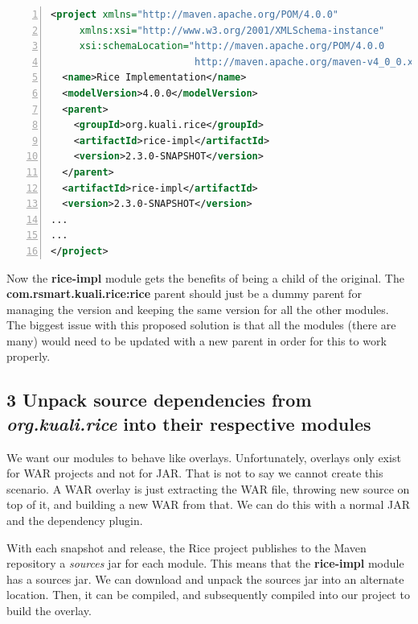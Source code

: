 \documentclass[12pt,notitlepage]{article}
\begin{document}
\begin{lstlisting}[numbers=left,language=xml,basicstyle=\scriptsize,backgroundcolor=\color{ubergray},caption={Custom Impl Module Alternative Parent Definition},frame=single,breaklines=true]
<project xmlns="http://maven.apache.org/POM/4.0.0" 
     xmlns:xsi="http://www.w3.org/2001/XMLSchema-instance" 
     xsi:schemaLocation="http://maven.apache.org/POM/4.0.0 
                         http://maven.apache.org/maven-v4_0_0.xsd">
  <name>Rice Implementation</name>
  <modelVersion>4.0.0</modelVersion>
  <parent>
    <groupId>org.kuali.rice</groupId>
    <artifactId>rice-impl</artifactId>
    <version>2.3.0-SNAPSHOT</version>
  </parent>
  <artifactId>rice-impl</artifactId>
  <version>2.3.0-SNAPSHOT</version>
...
...
</project>
  \end{lstlisting}

Now the \textbf{rice-impl} module gets the benefits of being a child of the original. The \textbf{com.rsmart.kuali.rice:rice} parent should just be a dummy parent for managing the version and keeping the same version for all the other modules. The biggest issue with this proposed solution is that all the modules (there are many) would need to be updated with a new parent in order for this to work properly.

\subsection*{3 Unpack source dependencies from \emph{org.kuali.rice} into their respective modules}
We want our modules to behave like overlays. Unfortunately, overlays only exist for WAR projects and not for JAR. That is not to say we cannot create this scenario. A WAR overlay is just extracting the WAR file, throwing new source on top of it, and building a new WAR from that. We can do this with a normal JAR and the dependency plugin. 

With each snapshot and release, the Rice project publishes to the Maven repository a \emph{sources} jar for each module. This means that the \textbf{rice-impl} module has a sources jar. We can download and unpack the sources jar into an alternate location. Then, it can be compiled, and subsequently compiled into our project to build the overlay.
\end{document}
